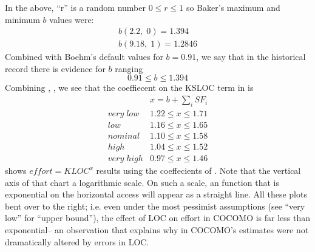 In the  above,  ``r'' is a random number $0 \le r \le 1$ so Baker's maximum and minimum $b$ values
were:
\[
\begin{array}{c}
b(2.2,\; 0) = 1.394\\
b(9.18,\; 1) =1.2846
\end{array}
\]
Combined with Boehm's default values for $b=0.91$, we say that in the historical record
there is evidence for $b$ ranging
\begin{equation}\label{eq:sf2}
0.91 \le b \le 1.394
\end{equation}
Combining , ,  we see that the coeffiecent on the 
KSLOC term in  is 
\begin{equation}\label{eq:sf3} 
\begin{array}{r|l}
                  &  x= b + \sum_i SF_i \\\hline
\mathit{very\; low} &  1.22 \le x \le 1.71\\
\mathit{  low} &  1.16 \le x \le 1.65 \\
\mathit{nominal}& 1.10 \le x \le 1.58    \\
\mathit{high} &  1.04 \le x \le 1.52  \\
\mathit{very\; high} & 0.97 \le x \le 1.46   
\end{array}
\end{equation} 
 shows   $\mathit{effort} = \mathit{KLOC}^x$ results using the coeffecients
of . Note that the vertical axis of that chart a logarithmic scale.
On such a scale, an function that is exponential on the horizontal access will
appear as a straight line. All these plots bent over to the right; i.e. even
under the most pessimist  assumptions (see ``very low'' for ``upper bound''), the
effect of LOC on effort in COCOMO is far less than exponential-- an observation
that explains why in  COCOMO's estimates were not dramatically altered
by errors in LOC.

